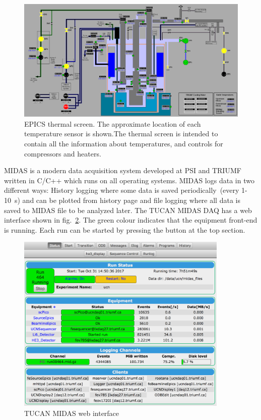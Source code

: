 \begin{figure}[h!]
  \centering
  \includegraphics[width=1.0\textwidth]{epics.png}
  \caption[TUCAN's EPICS thermal screen]{EPICS thermal screen. The
    approximate location of each temperature sensor is shown.The
    thermal screen is intended to contain all the information about
    temperatures, and controls for compressors and heaters. }
  \label{fig:epics}
\end{figure}

MIDAS is a modern data acquisition system developed at PSI and TRIUMF
written in C/C++ which runs on all operating systems. MIDAS logs data
in two different ways: History logging where some data is saved
periodically~(every 1-10~s) and can be plotted from history page and
file logging where all data is saved to MIDAS file to be analyzed
later. The TUCAN MIDAS DAQ has a web interface shown in
fig.~\ref{fig:midas}. The green colour indicates that the equipment
front-end is running. Each run can be started by pressing the button at
the top section.

\begin{figure}[h!]
  \centering
  \includegraphics[width=0.9\textwidth]{midas.png}
  \caption{TUCAN MIDAS web interface }
  \label{fig:midas}
\end{figure}

